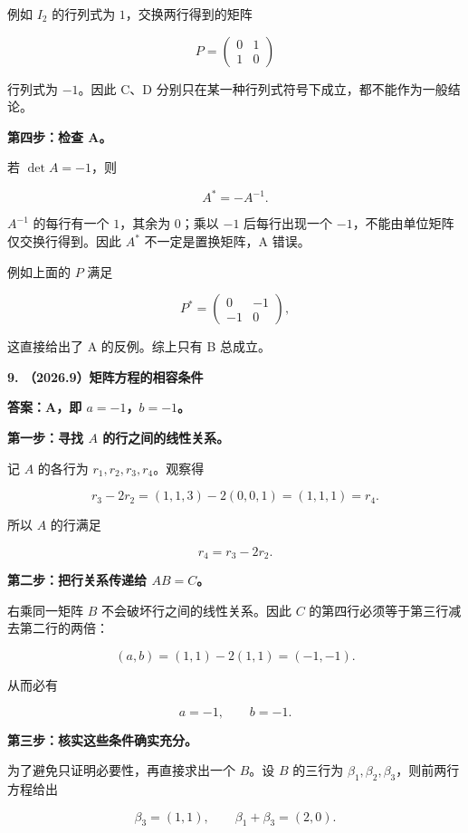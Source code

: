 \documentclass[UTF8,11pt,fontset=windows]{ctexart}
\begin{document}
例如 $I_2$ 的行列式为 $1$，交换两行得到的矩阵

$$
P=\begin{pmatrix}0&1\\1&0\end{pmatrix}
$$

行列式为 $-1$。因此 C、D 分别只在某一种行列式符号下成立，都不能作为一般结论。

\textbf{第四步：检查 A。}

若 $\det A=-1$，则

$$
A^*=-A^{-1}.
$$

$A^{-1}$ 的每行有一个 $1$，其余为 $0$；乘以 $-1$ 后每行出现一个 $-1$，不能由单位矩阵仅交换行得到。因此 $A^*$ 不一定是置换矩阵，A 错误。

例如上面的 $P$ 满足

$$
P^*=\begin{pmatrix}0&-1\\-1&0\end{pmatrix},
$$

这直接给出了 A 的反例。综上只有 B 总成立。

\clearpage

\textbf{9. （2026.9）矩阵方程的相容条件}

\textbf{答案：A，即 $a=-1$，$b=-1$。}

\textbf{第一步：寻找 $A$ 的行之间的线性关系。}

记 $A$ 的各行为 $r_1,r_2,r_3,r_4$。观察得

$$
r_3-2r_2=(1,1,3)-2(0,0,1)=(1,1,1)=r_4.
$$

所以 $A$ 的行满足

$$
r_4=r_3-2r_2.
$$

\textbf{第二步：把行关系传递给 $AB=C$。}

右乘同一矩阵 $B$ 不会破坏行之间的线性关系。因此 $C$ 的第四行必须等于第三行减去第二行的两倍：

$$
(a,b)=(1,1)-2(1,1)=(-1,-1).
$$

从而必有

$$
a=-1,\qquad b=-1.
$$

\textbf{第三步：核实这些条件确实充分。}

为了避免只证明必要性，再直接求出一个 $B$。设 $B$ 的三行为 $\beta_1,\beta_2,\beta_3$，则前两行方程给出

$$
\beta_3=(1,1),
\qquad
\beta_1+\beta_3=(2,0).
$$
\end{document}
